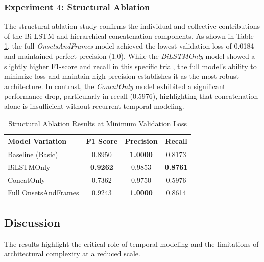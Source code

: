 \documentclass{article}
\begin{document}
\subsubsection{Experiment 4: Structural Ablation}
The structural ablation study confirms the individual and collective contributions of the Bi-LSTM and hierarchical concatenation components. As shown in Table \ref{tab:ablation_results}, the full \textit{OnsetsAndFrames} model achieved the lowest validation loss of 0.0184 and maintained perfect precision (1.0). While the \textit{BiLSTMOnly} model showed a slightly higher F1-score and recall in this specific trial, the full model's ability to minimize loss and maintain high precision establishes it as the most robust architecture. In contrast, the \textit{ConcatOnly} model exhibited a significant performance drop, particularly in recall (0.5976), highlighting that concatenation alone is insufficient without recurrent temporal modeling.

\begin{table}[ht]
  \caption{Structural Ablation Results at Minimum Validation Loss}
  \label{tab:ablation_results}
  \centering
  \begin{tabular}{lccc}
    \toprule
    Model Variation & F1 Score & Precision & Recall \\
    \midrule
    Baseline (Basic)      & 0.8950 & \textbf{1.0000} & 0.8173 \\
    BiLSTMOnly            & \textbf{0.9262} & 0.9853 & \textbf{0.8761} \\
    ConcatOnly            & 0.7362 & 0.9750 & 0.5976 \\
    Full OnsetsAndFrames  & 0.9243 & \textbf{1.0000} & 0.8614 \\
    \bottomrule
  \end{tabular}
\end{table}

\subsection{Discussion}
The results highlight the critical role of temporal modeling and the limitations of architectural complexity at a reduced scale.
\end{document}
